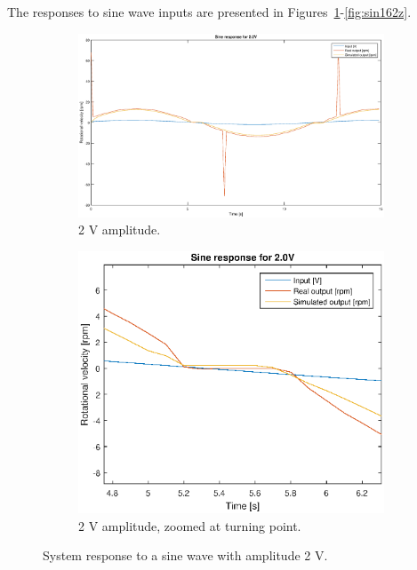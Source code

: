 The responses to sine wave inputs are presented in Figures~\ref{fig:sin22}-\ref{fig:sin162z}.
\begin{figure}[H]
    \centering
    \begin{subfigure}[H]{0.48\textwidth}
    \includegraphics[width=\textwidth]{./img/testrig_2Vsine_no_i_fric.eps}
    \caption{2 V amplitude.}
    \label{fig:sin22}
    \end{subfigure}
    \begin{subfigure}[H]{0.48\textwidth}
    \includegraphics[width=\textwidth]{./img/testrig_2Vsine_no_i_fric_zoom.eps}
    \caption{2 V amplitude, zoomed at turning point.}
    \label{fig:sin22z}
    \end{subfigure}
    \caption{System response to a sine wave with amplitude 2 V.}
\end{figure}
